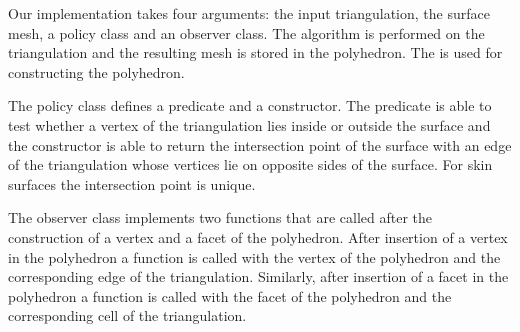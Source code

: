 Our implementation takes four arguments: the input triangulation, the
surface mesh, a policy class and an observer class.  The algorithm is
performed on the triangulation and the resulting mesh is stored in the
polyhedron. The  is used
for constructing the polyhedron.

The policy class defines a predicate and a constructor. The predicate
is able to test whether a vertex of the triangulation lies inside or
outside the surface and the constructor is able to return the
intersection point of the surface with an edge of the triangulation
whose vertices lie on opposite sides of the surface. For skin surfaces
the intersection point is unique.

The observer class implements two functions that are called after the
construction of a vertex and a facet of the polyhedron. After
insertion of a vertex in the polyhedron a function is called with the
vertex of the polyhedron and the corresponding edge of the
triangulation. Similarly, after insertion of a facet in the polyhedron
a function is called with the facet of the polyhedron and the
corresponding cell of the triangulation. 

